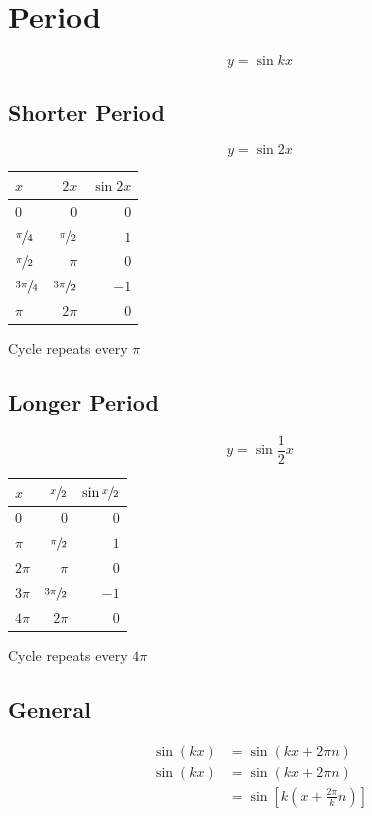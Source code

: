 \documentclass{exam}
\begin{document}
  \section{Period}
  \[
    y = \sin kx
  \]

  \subsection{Shorter Period}
  \[
    y = \sin 2x
  \]

  \begin{tabular}[H]{lrr}
    \toprule
    $x$                & $2x$               & $\sin 2x$ \\
    \midrule
    $0$                & $0$                & $0$ \\
    $\sfrac{\pi}{4}$   & $\sfrac{\pi}{2}$   & $1$ \\
    $\sfrac{\pi}{2}$   & $\pi$              & $0$ \\
    $\sfrac{3 \pi}{4}$ & $\sfrac{3 \pi}{2}$ & $-1$ \\
    $\pi$              & $2 \pi$            & $0$ \\
    \bottomrule
  \end{tabular}

  Cycle repeats every $\pi$

  \subsection{Longer Period}
  \[
    y = \sin \frac{1}{2} x
  \]

  \begin{tabular}[H]{lrr}
    \toprule
    $x$     & $\sfrac{x}{2}$     & $\sin \sfrac{x}{2}$ \\
    \midrule
    $0$     & $0$                & $0$ \\
    $\pi$   & $\sfrac{\pi}{2}$   & $1$ \\
    $2 \pi$ & $\pi$              & $0$ \\
    $3\pi$  & $\sfrac{3 \pi}{2}$ & $-1$ \\
    $4 \pi$ & $2 \pi$            & $0$ \\
    \bottomrule
  \end{tabular}

  Cycle repeats every $4 \pi$

  \subsection{General}
  \begin{align*}
    \sin(kx) & = \sin(kx + 2 \pi n) \\
    \sin(kx) & = \sin(kx + 2 \pi n) \\
             & = \sin \left[ k \left(x + \frac{2 \pi}{k} n \right) \right ] \\
  \end{align*}
\end{document}
